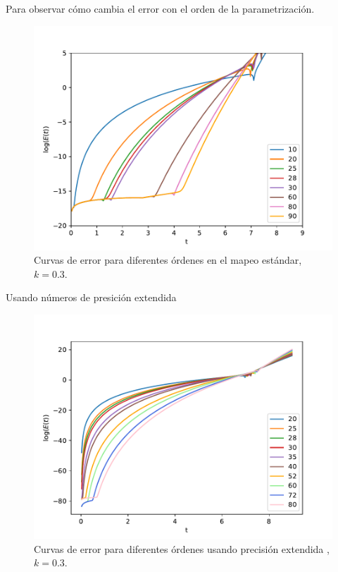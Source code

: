 \documentclass[11pt]{beamer}
\theoremstyle{definition}
\begin{document}
\begin{frame}
Para observar c\'omo cambia el error con el orden de la parametrizaci\'on.
\begin{figure}[H]
\centering
\includegraphics[scale=0.5]{errorf64}
\caption{Curvas de error para diferentes órdenes en el mapeo estándar, $k=0.3$. }
\label{erroresf64}
\end{figure}
\end{frame}

\begin{frame}
Usando n\'umeros de presici\'on extendida
\begin{figure}[H]
\centering
\includegraphics[scale=0.6]{errorbf}
\caption{Curvas de error para diferentes órdenes usando precisión extendida ,$k=0.3$. }
\label{erroresBig}
\end{figure}
\end{frame}
\end{document}

